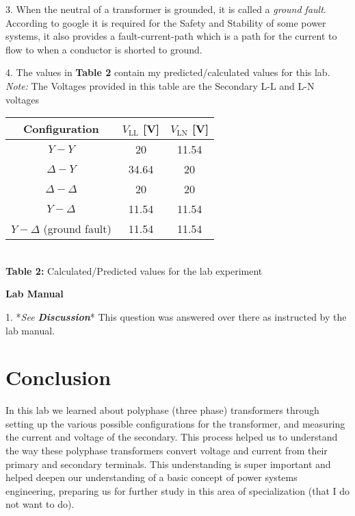 \documentclass[]{report}
\begin{document}
3. When the neutral of a transformer is grounded, it is called a \textit{ground fault}. According to google it is required for the Safety and Stability of some power systems, it also provides a fault-current-path which is a path for the current to flow to when a conductor is shorted to ground. 

4. The values in \textbf{Table 2} contain my predicted/calculated values for this lab. \textit{Note:} The Voltages provided in this table are the Secondary L-L and L-N voltages

\begin{table}[h]
	\centering
		\begin{tabular}{@{}c|cc@{}}
		Configuration          			& $V_\text{LL}$ [V]	& $V_\text{LN}$ [V]		\\ \midrule
		$Y-Y $                   		&  20  		&   11.54 		\\
		$\Delta-Y$                  	&  34.64 	&   20 		\\
		$\Delta-\Delta$             	&  20 		&   20		\\
		$Y-\Delta$                  	&  11.54  	&   11.54 		\\
		$Y-\Delta$ (ground fault) 		&  11.54  	&   11.54 		\\
	\end{tabular} \\ \vspace{1em}
	\textbf{Table 2:} Calculated/Predicted values for the lab experiment
\end{table}

\textbf{Lab Manual}

1. *\textit{See \textbf{Discussion}}* This question was answered over there as instructed by the lab manual.

\section*{Conclusion}

In this lab we learned about polyphase (three phase) transformers through setting up the various possible configurations for the transformer, and measuring the current and voltage of the secondary. This process helped us to understand the way these polyphase transformers convert voltage and current from their primary and secondary terminals. This understanding is super important and helped deepen our understanding of a basic concept of power systems engineering, preparing us for further study in this area of specialization (that I do not want to do).
\end{document}
